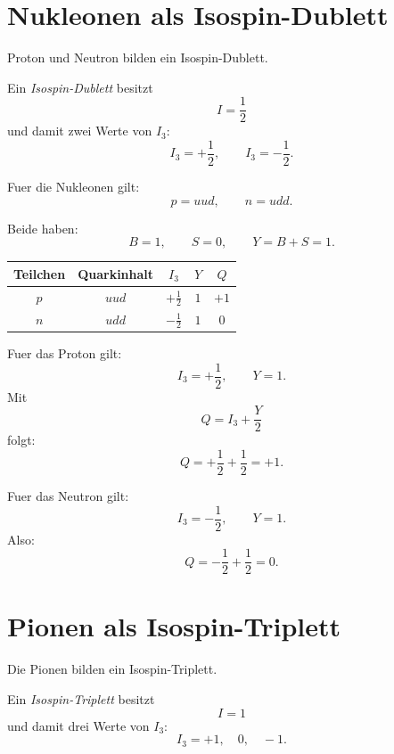 \section{Nukleonen als Isospin-Dublett}

Proton und Neutron bilden ein Isospin-Dublett.

\begin{definitionbox}
Ein \emph{Isospin-Dublett} besitzt
\[
    I=\frac{1}{2}
\]
und damit zwei Werte von $I_3$:
\[
    I_3=+\frac{1}{2},
    \qquad
    I_3=-\frac{1}{2}.
\]
\end{definitionbox}

\begin{conceptbox}
Fuer die Nukleonen gilt:
\[
    p=uud,
    \qquad
    n=udd.
\]

Beide haben:
\[
    B=1,
    \qquad
    S=0,
    \qquad
    Y=B+S=1.
\]
\end{conceptbox}

\begin{center}
\begin{tabular}{|c|c|c|c|c|}
\hline
Teilchen & Quarkinhalt & $I_3$ & $Y$ & $Q$ \\
\hline
$p$ & $uud$ & $+\frac{1}{2}$ & $1$ & $+1$ \\
\hline
$n$ & $udd$ & $-\frac{1}{2}$ & $1$ & $0$ \\
\hline
\end{tabular}
\end{center}

\begin{examplebox}
Fuer das Proton gilt:
\[
    I_3=+\frac{1}{2},
    \qquad
    Y=1.
\]
Mit
\[
    Q=I_3+\frac{Y}{2}
\]
folgt:
\[
    Q=+\frac{1}{2}+\frac{1}{2}=+1.
\]
\end{examplebox}

\begin{examplebox}
Fuer das Neutron gilt:
\[
    I_3=-\frac{1}{2},
    \qquad
    Y=1.
\]
Also:
\[
    Q=-\frac{1}{2}+\frac{1}{2}=0.
\]
\end{examplebox}

\section{Pionen als Isospin-Triplett}

Die Pionen bilden ein Isospin-Triplett.

\begin{definitionbox}
Ein \emph{Isospin-Triplett} besitzt
\[
    I=1
\]
und damit drei Werte von $I_3$:
\[
    I_3=+1,\quad 0,\quad -1.
\]
\end{definitionbox}

